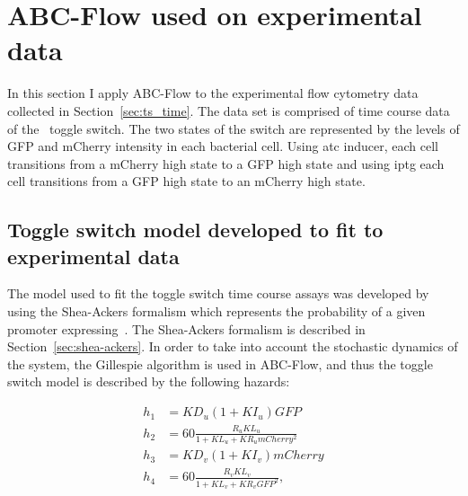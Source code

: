 %

\section{ABC-Flow used on experimental data}
 
In this section I apply ABC-Flow to the experimental flow cytometry data collected in Section~\ref{sec:ts_time}. The data set is comprised of time course data of the~\textcite{Litcofsky:2012gr} toggle switch. The two states of the switch are represented by the levels of GFP and mCherry intensity in each bacterial cell. Using \acrshort{atc} inducer, each cell transitions from a mCherry high state to a GFP high state and using \acrshort{iptg} each cell transitions from a GFP high state to an mCherry high state. 


\subsection{Toggle switch model developed to fit to experimental data}
\label{sec:Real_model}
The model used to fit the toggle switch time course assays was developed by using the Shea-Ackers formalism which represents the probability of a given promoter expressing~\autocite{Ackers:1982tq}. The Shea-Ackers formalism is described in Section~\ref{sec:shea-ackers}. In order to take into account the stochastic dynamics of the system, the Gillespie algorithm is used in ABC-Flow, and thus the toggle switch model is described by the following hazards:

\begin{align}
h_1 &= KD_u  (1 + KI_u)  GFP\\
h_2 &= 60  \frac{R_u KL_u}{1 + KL_u + KR_u  mCherry^2}\\
h_3 &= KD_v  (1 + KI_v)  mCherry\\
h_4 &= 60  \frac{R_v  KL_v}{1+ KL_v + KR_v  GFP^2},
\end{align}    
    
